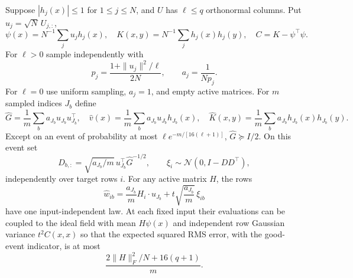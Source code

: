 \begin{lemma}
\label{lem:whitened}
Suppose $|h_j(x)|\le1$ for $1\le j\le N$, and $U$ has $\ell\le q$
orthonormal columns. Put $u_j=\sqrt N\,U_{j,:}$,
\[
 \psi(x)=N^{-1}\sum_j u_jh_j(x),\quad
 K(x,y)=N^{-1}\sum_jh_j(x)h_j(y),\quad C=K-\psi^\top\psi.
\]
For $\ell>0$ sample independently with
\[
 p_j=\frac{1+\|u_j\|^2/\ell}{2N},\qquad a_j=\frac1{Np_j}.
\]
For $\ell=0$ use uniform sampling, $a_j=1$, and empty active matrices.
For $m$ sampled indices $J_b$ define
\[
 \widehat G=\frac1m\sum_ba_{J_b}u_{J_b}u_{J_b}^\top,\quad
 \widehat v(x)=\frac1m\sum_ba_{J_b}u_{J_b}h_{J_b}(x),\quad
 \widehat K(x,y)=\frac1m\sum_ba_{J_b}h_{J_b}(x)h_{J_b}(y).
\]
Except on an event of probability at most
$\ell e^{-m/[16(\ell+1)]}$, $\widehat G\succeq I/2$.
On this event set
\[
 D_{b,:}=\sqrt{a_{J_b}/m}\,u_{J_b}^\top\widehat G^{-1/2},
 \qquad \xi_i\sim\mathcal N(0,I-DD^\top),
\]
independently over target rows $i$. For any active matrix $H$, the rows
\begin{equation}\label{eq:new-finite-row}
 \widehat w_{ib}=\frac{a_{J_b}}mH_i\cdot u_{J_b}
                  +t\sqrt{\frac{a_{J_b}}m}\,\xi_{ib}
\end{equation}
have one input-independent law. At each fixed input their evaluations can
be coupled to the ideal field with mean $H\psi(x)$ and independent row
Gaussian variance $t^2C(x,x)$ so that the expected squared RMS error,
with the good-event indicator, is at most
\[
 \frac{2\|H\|_F^2/N+16(q+1)}m.                              \tag{W}
\]
\end{lemma}
